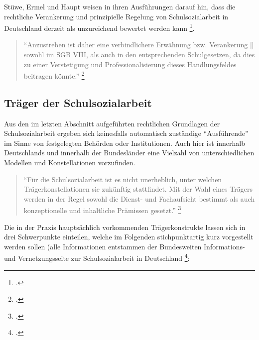 Stüwe, Ermel und Haupt weisen in ihren Ausführungen darauf hin, dass die rechtliche Verankerung und prinzipielle Regelung von Schulsozialarbeit in Deutschland derzeit als unzureichend bewertet werden kann \footcite[30]{Stuewe2015}. 

\begin{quotation}
\noindent
"`Anzustreben ist daher eine verbindlichere Erwähnung bzw. Verankerung [\punkte] sowohl im SGB VIII, als auch in den entsprechenden Schulgesetzen, da dies zu einer Verstetigung und Professionalisierung dieses Handlungsfeldes beitragen könnte."' \footcite[30]{Stuewe2015}
\end{quotation}

\subsection{Träger der Schulsozialarbeit}
\label{sec:TrägerDerSchulsozialarbeit}

Aus den im letzten Abschnitt aufgeführten rechtlichen Grundlagen der Schulsozialarbeit ergeben sich keinesfalls automatisch zuständige "`Ausführende"' im Sinne von festgelegten Behörden oder Institutionen. Auch hier ist innerhalb Deutschlands und innerhalb der Bundesländer eine Vielzahl von unterschiedlichen Modellen und Konstellationen vorzufinden. 

\begin{quotation}
\noindent
"`Für die Schulsozialarbeit ist es nicht unerheblich, unter welchen Trägerkonstellationen sie zukünftig stattfindet. Mit der Wahl eines Trägers werden in der Regel sowohl die Dienst- und Fachaufsicht bestimmt als auch konzeptionelle und inhaltliche Prämissen gesetzt."' \footcite{BIVSD2013}
\end{quotation}

\noindent
Die in der Praxis hauptsächlich vorkommenden Trägerkonstrukte lassen sich in drei Schwerpunkte einteilen, welche im Folgenden stichpunktartig kurz vorgestellt werden sollen (alle Informationen entstammen der Bundesweiten Informations- und Vernetzungsseite zur Schulsozialarbeit in Deutschland \footcite{BIVSD2013}:\\

